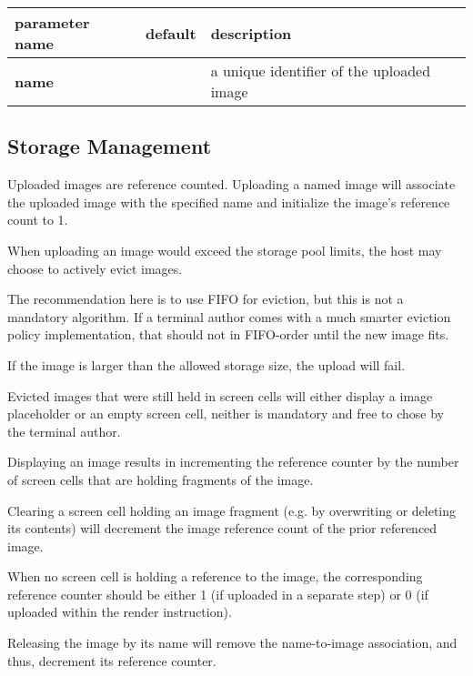 \documentclass[a4paper]{article}
\begin{document}
\begin{tabular}{|l|l|l|}
    \hline
    \textbf{parameter name} & \textbf{default} & \textbf{description} \\
    \hline
    \textbf{name}       & & a unique identifier of the uploaded image \\
    \hline
\end{tabular}

\subsection{Storage Management} %

Uploaded images are reference counted.
Uploading a named image will associate the uploaded image with the specified
name and initialize the image's reference count to 1.

When uploading an image would exceed the storage pool limits,
the host may choose to actively evict images.

The recommendation here is to use FIFO for eviction,
but this is not a mandatory algorithm.
If a terminal author comes with a much smarter eviction policy implementation,
that should not in FIFO-order until the new image fits.

If the image is larger than the allowed storage size, the upload will fail.

Evicted images that were still held in screen cells will
either display a image placeholder or an empty screen cell, neither
is mandatory and free to chose by the terminal author.

Displaying an image results in incrementing the reference counter
by the number of screen cells that are holding fragments of the image.

Clearing a screen cell holding an image fragment (e.g. by overwriting
or deleting its contents) will decrement the image reference count of
the prior referenced image.

When no screen cell is holding a reference to the image,
the corresponding reference counter should be either 1 (if uploaded in a separate step)
or 0 (if uploaded within the render instruction).

Releasing the image by its name will remove the name-to-image association, and thus,
decrement its reference counter.
\end{document}
